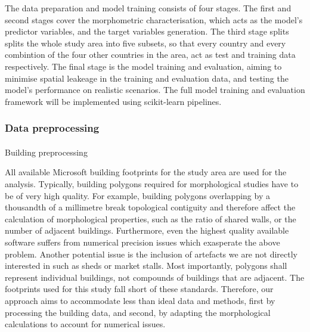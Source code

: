 \documentclass[
  letterpaper,
  DIV=11,
  numbers=noendperiod]{scrartcl}
\makeatletter
\let\oldparagraph\paragraph
\renewcommand{\paragraph}{
    \@ifstar
      \xxxParagraphStar
      \xxxParagraphNoStar
  }
\newcommand{\xxxParagraphStar}[1]{\oldparagraph*{#1}\mbox{}}
\newcommand{\xxxParagraphNoStar}[1]{\oldparagraph{#1}\mbox{}}
\makeatother
\begin{document}
The data preparation and model training consists of four stages. The
first and second stages cover the morphometric characterisation, which
acts as the model's predictor variables, and the target variables
generation. The third stage splits splits the whole study area into five
subsets, so that every country and every combintion of the four other
countries in the area, act as test and training data respectively. The
final stage is the model training and evaluation, aiming to minimise
spatial leakeage in the training and evaluation data, and testing the
model's performance on realistic scenarios. The full model training and
evaluation framework will be implemented using scikit-learn pipelines.

\subsubsection{Data preprocessing}\label{data-preprocessing}

\paragraph{Building preprocessing}\label{building-preprocessing}

All available Microsoft building footprints for the study area are used
for the analysis. Typically, building polygons required for
morphological studies have to be of very high quality. For example,
building polygons overlapping by a thousandth of a millimetre break
topological contiguity and therefore affect the calculation of
morphological properties, such as the ratio of shared walls, or the
number of adjacent buildings. Furthermore, even the highest quality
available software suffers from numerical precision issues which
exasperate the above problem. Another potential issue is the inclusion
of artefacts we are not directly interested in such as sheds or market
stalls. Most importantly, polygons shall represent individual buildings,
not compounds of buildings that are adjacent. The footprints used for
this study fall short of these standards. Therefore, our approach aims
to accommodate less than ideal data and methods, first by processing the
building data, and second, by adapting the morphological calculations to
account for numerical issues.
\end{document}
